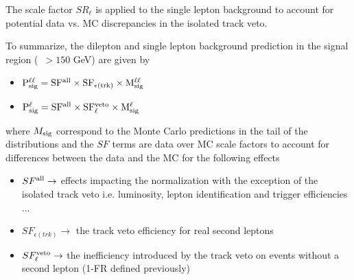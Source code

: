 The scale factor $SR_{\ell}$ is applied to the single lepton background to account for potential data vs. MC discrepancies 
in the isolated track veto.

To summarize, the dilepton and single lepton background prediction in the signal region (\mt\ $>150$ GeV) are given by

\begin{itemize}
\item $\rm{P}^{\ell\ell}_{\rm{sig}} = SF^{\rm{all}} \times SF_{\epsilon(trk)} \times M^{\ell \ell}_{\rm{sig}}$
\item $\rm{P}^{\ell}_{\rm{sig}} = SF^{\rm{all}} \times SF_{\ell}^{\rm{veto}} \times M^{\ell}_{\rm{sig}}$
\end{itemize}

where $M_{\rm{sig}}$ correspond to the Monte Carlo predictions in the tail of the distributions and the $SF$ terms are data over MC scale factors to account 
for differences between the data and the MC for the following effects

\begin{itemize}
\item $SF^{\rm{all}} \rightarrow $ effects impacting the normalization with the exception of the isolated track veto i.e. luminosity, 
lepton identification and trigger efficiencies $\dots$
\item $SF_{\epsilon(trk)} \rightarrow $ the track veto efficiency for real second leptons
\item $SF_{\ell}^{\rm{veto}} \rightarrow $ the inefficiency introduced by the track veto on events without a second lepton (1-FR defined previously)
\end{itemize}




